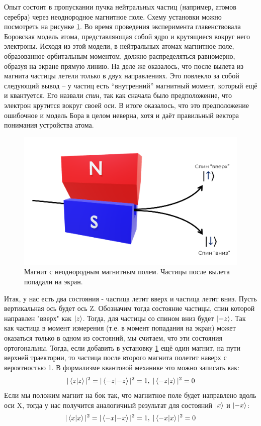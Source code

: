 Опыт состоит в пропускании пучка нейтральных частиц (например, атомов серебра) через неоднородное магнитное поле. Схему установки можно посмотреть на рисунке \ref{fig B.1}. Во время проведения эксперимента главенствовала Боровская модель атома, представляющая собой ядро и крутящиеся вокруг него электроны. Исходя из этой модели, в нейтральных атомах магнитное поле, образованное орбитальным моментом, должно распределяться равномерно, образуя на экране прямую линию. На деле же оказалось, что после вылета из магнита частицы летели только в двух направлениях. Это повлекло за собой следующий вывод -- у частиц есть ``внутренний'' магнитный момент, который ещё и квантуется. Его назвали \textit{спин}, так как сначала было предположение, что электрон крутится вокруг своей оси. В итоге оказалось, что это предположение ошибочное и модель Бора в целом неверна, хотя и даёт правильный вектора понимания устройства атома.
\begin{figure}[!ht]
\centering
\includegraphics[scale=0.4]{appendix/images/gc.png}
\caption{Магнит с неоднородным магнитным полем. Частицы после вылета попадали на экран.}
\label{fig B.1}
\end{figure}

Итак, у нас есть два состояния - частица летит вверх и частица летит вниз. Пусть вертикальная ось будет ось Z. Обозначим тогда состояние частицы, спин которой направлен "вверх" как $\ket{z}$. Тогда, для частицы со спином вниз будет $\ket{-z}$. Так как частица в момент измерения (т.е. в момент попадания на экран) может оказаться только в одном из состояний, мы считаем, что эти состояния ортогональны. Тогда, если добавить в установку \ref{fig B.1} ещё один магнит, на пути верхней траектории, то частица после второго магнита полетит наверх с вероятностью 1. В формализме квантовой механике это можно записать как:
\[
|\bra{z}\ket{z}|^2 = |\bra{-z}\ket{-z}|^2 = 1,\; |\bra{-z}\ket{z}|^2 = 0
\]
Если мы положим магнит на бок так, что магнитное поле будет направлено вдоль оси X, тогда у нас получится аналогичный результат для состояний $\ket{x}$ и $\ket{-x}$:
\[
|\bra{x}\ket{x}|^2 = |\bra{-x}\ket{-x}|^2 = 1,\;|\bra{-x}\ket{x}|^2 = 0
\]

